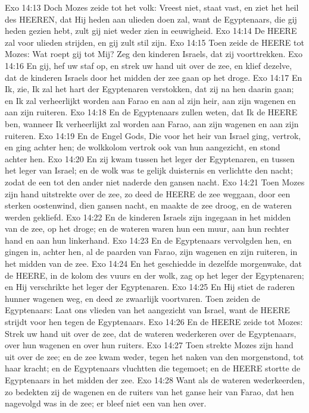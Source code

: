 Exo 14:13  Doch Mozes zeide tot het volk: Vreest niet, staat vast, en ziet het heil des HEEREN, dat Hij heden aan ulieden doen zal, want de Egyptenaars, die gij heden gezien hebt, zult gij niet weder zien in eeuwigheid.
Exo 14:14  De HEERE zal voor ulieden strijden, en gij zult stil zijn.
Exo 14:15  Toen zeide de HEERE tot Mozes: Wat roept gij tot Mij? Zeg den kinderen Israels, dat zij voorttrekken.
Exo 14:16  En gij, hef uw staf op, en strek uw hand uit over de zee, en klief dezelve, dat de kinderen Israels door het midden der zee gaan op het droge.
Exo 14:17  En Ik, zie, Ik zal het hart der Egyptenaren verstokken, dat zij na hen daarin gaan; en Ik zal verheerlijkt worden aan Farao en aan al zijn heir, aan zijn wagenen en aan zijn ruiteren.
Exo 14:18  En de Egyptenaars zullen weten, dat Ik de HEERE ben, wanneer Ik verheerlijkt zal worden aan Farao, aan zijn wagenen en aan zijn ruiteren.
Exo 14:19  En de Engel Gods, Die voor het heir van Israel ging, vertrok, en ging achter hen; de wolkkolom vertrok ook van hun aangezicht, en stond achter hen.
Exo 14:20  En zij kwam tussen het leger der Egyptenaren, en tussen het leger van Israel; en de wolk was te gelijk duisternis en verlichtte den nacht; zodat de een tot den ander niet naderde den gansen nacht.
Exo 14:21  Toen Mozes zijn hand uitstrekte over de zee, zo deed de HEERE de zee weggaan, door een sterken oostenwind, dien gansen nacht, en maakte de zee droog, en de wateren werden gekliefd.
Exo 14:22  En de kinderen Israels zijn ingegaan in het midden van de zee, op het droge; en de wateren waren hun een muur, aan hun rechter hand en aan hun linkerhand.
Exo 14:23  En de Egyptenaars vervolgden hen, en gingen in, achter hen, al de paarden van Farao, zijn wagenen en zijn ruiteren, in het midden van de zee.
Exo 14:24  En het geschiedde in dezelfde morgenwake, dat de HEERE, in de kolom des vuurs en der wolk, zag op het leger der Egyptenaren; en Hij verschrikte het leger der Egyptenaren.
Exo 14:25  En Hij stiet de raderen hunner wagenen weg, en deed ze zwaarlijk voortvaren. Toen zeiden de Egyptenaars: Laat ons vlieden van het aangezicht van Israel, want de HEERE strijdt voor hen tegen de Egyptenaars.
Exo 14:26  En de HEERE zeide tot Mozes: Strek uw hand uit over de zee, dat de wateren wederkeren over de Egyptenaars, over hun wagenen en over hun ruiters.
Exo 14:27  Toen strekte Mozes zijn hand uit over de zee; en de zee kwam weder, tegen het naken van den morgenstond, tot haar kracht; en de Egyptenaars vluchtten die tegemoet; en de HEERE stortte de Egyptenaars in het midden der zee.
Exo 14:28  Want als de wateren wederkeerden, zo bedekten zij de wagenen en de ruiters van het ganse heir van Farao, dat hen nagevolgd was in de zee; er bleef niet een van hen over.
